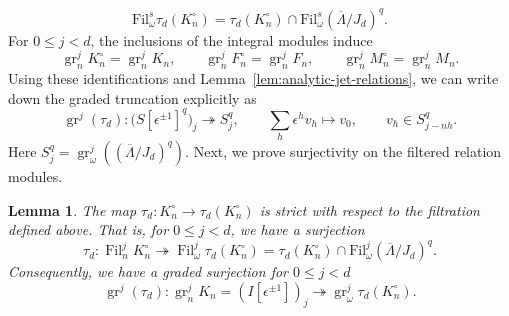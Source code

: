 \documentclass[11pt]{article}
\newtheorem{lemma}[theorem]{Lemma}
\theoremstyle{definition}
\newcommand{\gr}{\operatorname{gr}}
\newcommand{\Fil}{\operatorname{Fil}}
\begin{document}
\[
 \mathrm{Fil}_\omega^s\tau_d(K_n^\circ)
 =\tau_d(K_n^\circ)\cap
   \mathrm{Fil}_\omega^s(\overline\Lambda/J_d)^{q}.
\]
For $0\leq j<d$, the inclusions of the integral modules induce
\[
 \gr_n^jK_n^\circ=\gr_n^jK_n,
 \qquad \gr_n^jF_n^\circ=\gr_n^jF_n,
 \qquad \gr_n^jM_n^\circ=\gr_n^jM_n.
\]
Using these identifications and
Lemma~\ref{lem:analytic-jet-relations}, we can write down the graded truncation explicitly as
\[
 \gr^j(\tau_d):
 \bigl(S[\epsilon^{\pm1}]^{q}\bigr)_j
 \twoheadrightarrow S_j^{q},\qquad
 \sum_h\epsilon^hv_h\longmapsto v_0,
 \qquad v_h\in S_{j-nh}^{q}.
\]
Here $S_j^{q}=\gr_\omega^j((\overline\Lambda/J_d)^{q})$.
Next, we prove surjectivity on the filtered relation modules.

\begin{lemma}\label{lem:analytic-jet-degree-lift} The map $\tau_d\colon K_n^\circ\to\tau_d(K_n^\circ)$ is strict with respect to the filtration defined above. 
That is, for $0\leq j<d$, we have a surjection
\[
 \tau_d:\Fil_n^jK_n^\circ
 \twoheadrightarrow\Fil_\omega^j\tau_d(K_n^\circ)=\tau_d(K_n^\circ)\cap\mathrm{Fil}_{\omega}^j(\overline{\Lambda}/J_d)^{q}.
\]
Consequently, we have a graded surjection for $0\le j<d$
\[
 \gr^j(\tau_d):\gr_n^jK_n=(I[\epsilon^{\pm1}])_j
 \twoheadrightarrow\gr_\omega^j\tau_d(K_n^\circ).
\]
\end{lemma}
\end{document}
